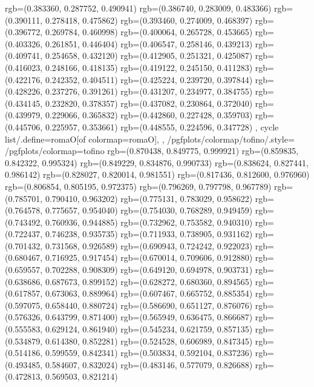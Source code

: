 {{{					rgb=(0.383360, 0.287752, 0.490941)
					rgb=(0.386740, 0.283009, 0.483366)
					rgb=(0.390111, 0.278418, 0.475862)
					rgb=(0.393460, 0.274009, 0.468397)
					rgb=(0.396772, 0.269784, 0.460998)
					rgb=(0.400064, 0.265728, 0.453665)
					rgb=(0.403326, 0.261851, 0.446404)
					rgb=(0.406547, 0.258146, 0.439213)
					rgb=(0.409741, 0.254658, 0.432120)
					rgb=(0.412905, 0.251321, 0.425087)
					rgb=(0.416023, 0.248166, 0.418135)
					rgb=(0.419122, 0.245150, 0.411283)
					rgb=(0.422176, 0.242352, 0.404511)
					rgb=(0.425224, 0.239720, 0.397844)
					rgb=(0.428226, 0.237276, 0.391261)
					rgb=(0.431207, 0.234977, 0.384755)
					rgb=(0.434145, 0.232820, 0.378357)
					rgb=(0.437082, 0.230864, 0.372040)
					rgb=(0.439979, 0.229066, 0.365832)
					rgb=(0.442860, 0.227428, 0.359703)
					rgb=(0.445706, 0.225957, 0.353661)
					rgb=(0.448555, 0.224596, 0.347728)
			},
		cycle list/.define={romaO}{[of colormap=romaO]},
		},
		/pgfplots/colormap/tofino/.style={
			/pgfplots/colormap={tofino}{%
					rgb=(0.870438, 0.849775, 0.999921)
					rgb=(0.859835, 0.842322, 0.995324)
					rgb=(0.849229, 0.834876, 0.990733)
					rgb=(0.838624, 0.827441, 0.986142)
					rgb=(0.828027, 0.820014, 0.981551)
					rgb=(0.817436, 0.812600, 0.976960)
					rgb=(0.806854, 0.805195, 0.972375)
					rgb=(0.796269, 0.797798, 0.967789)
					rgb=(0.785701, 0.790410, 0.963202)
					rgb=(0.775131, 0.783029, 0.958622)
					rgb=(0.764578, 0.775657, 0.954040)
					rgb=(0.754030, 0.768289, 0.949459)
					rgb=(0.743492, 0.760936, 0.944885)
					rgb=(0.732962, 0.753582, 0.940310)
					rgb=(0.722437, 0.746238, 0.935735)
					rgb=(0.711933, 0.738905, 0.931162)
					rgb=(0.701432, 0.731568, 0.926589)
					rgb=(0.690943, 0.724242, 0.922023)
					rgb=(0.680467, 0.716925, 0.917454)
					rgb=(0.670014, 0.709606, 0.912880)
					rgb=(0.659557, 0.702288, 0.908309)
					rgb=(0.649120, 0.694978, 0.903731)
					rgb=(0.638686, 0.687673, 0.899152)
					rgb=(0.628272, 0.680360, 0.894565)
					rgb=(0.617857, 0.673063, 0.889964)
					rgb=(0.607467, 0.665752, 0.885354)
					rgb=(0.597075, 0.658440, 0.880724)
					rgb=(0.586690, 0.651127, 0.876076)
					rgb=(0.576326, 0.643799, 0.871400)
					rgb=(0.565949, 0.636475, 0.866687)
					rgb=(0.555583, 0.629124, 0.861940)
					rgb=(0.545234, 0.621759, 0.857135)
					rgb=(0.534879, 0.614380, 0.852281)
					rgb=(0.524528, 0.606989, 0.847345)
					rgb=(0.514186, 0.599559, 0.842341)
					rgb=(0.503834, 0.592104, 0.837236)
					rgb=(0.493485, 0.584607, 0.832024)
					rgb=(0.483146, 0.577079, 0.826688)
					rgb=(0.472813, 0.569503, 0.821214)
}}}
